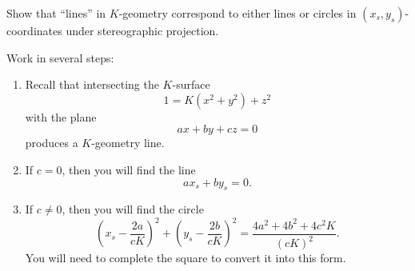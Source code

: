 \documentclass[newpage,handout,hints,12pt,noauthor,nooutcomes]{ximera}
\begin{document}
\begin{problem}
  Show that ``lines'' in $K$-geometry correspond to either lines or circles in
  $(x_{s},y_{s})$-coordinates under stereographic projection.

  \begin{hint}
    Work in several steps:
\begin{enumerate}
\item Recall that intersecting the $K$-surface
  \[
  1 = K\left(x^2+y^2\right) + z^2 
  \]
  with the plane
  \[
  ax+by+cz = 0
  \]
  produces a $K$-geometry line.
\item If $c=0$, then you will find the line
  \[
   ax_s + by_s = 0.
  \]
\item If $c\ne 0$, then you will find the circle
  \[
   \left(x_s - \frac{2a}{cK}\right)^2 + \left(y_s -
   \frac{2b}{cK}\right)^2 = \frac{4a^2 + 4b^2 + 4c^2K}{(cK)^2}.
   \]
   You will need to complete the square to convert it into this form.
\end{enumerate}
\end{hint}


\end{problem}
\end{document}
